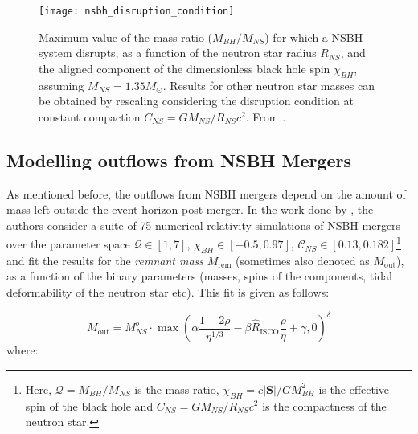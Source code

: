     \begin{figure}[H]
        \centering
        \texttt{[image: nsbh\_disruption\_condition]}
        \caption[Disruption condition in a NSBH binary]{
                    Maximum value of the mass-ratio ($M_{BH}/M_{NS}$) for which a NSBH
                    system disrupts, as a function of the neutron star radius $R_{NS}$,
                    and the aligned component of the dimensionless black hole spin
                    $\chi_{BH}$, assuming $M_{NS} = 1.35 M_{\odot}$. Results for other
                    neutron star masses can be obtained by rescaling considering the
                    disruption condition at constant compaction $C_{NS} = GM_{NS}/R_{NS}
                    c^2$. From \cite{foucart_2020}.
            }
        \label{fig:nsbh_disruption_condition}
    \end{figure}

    \subsection{Modelling outflows from NSBH Mergers}\label{ssec:outflows-nsbh}

    As mentioned before, the outflows from NSBH mergers depend on the amount of mass
    left outside the event horizon post-merger. In the work done by \cite{foucart_2018},
    the authors consider a suite of 75 numerical relativity simulations of NSBH mergers
    over the parameter space $\mathcal{Q} \in [1, 7]$, $ \chi_{BH} \in [-0.5, 0.97]$,
    $\mathcal{C}_{NS} \in [0.13, 0.182]$\footnote{
        Here, $\mathcal{Q} = M_{BH}/M_{NS}$ is the mass-ratio, $\chi_{BH} =
        c|\mathbf{S}|/GM_{BH}^2$ is the effective spin of the black hole and $C_{NS} =
        GM_{NS}/R_{NS}c^2$ is the compactness of the neutron star.
    }
    and fit the results for the \textit{remnant mass} $M_{\mathrm{rem}}$ (sometimes also
    denoted as $M_{\mathrm{out}}$), as a function of the binary parameters (masses,
    spins of the components, tidal deformability of the neutron star etc). This fit is
    given as follows:

    \begin{equation}
        M_{\mathrm{out}} =
            M_{NS}^b \cdot
            \max \left( \alpha \dfrac{1-2\rho}{\eta^{1/3}} -
            \beta \hat{R}_{\mathrm{ISCO}} \dfrac{\rho}{\eta} + \gamma, 0 \right)^\delta
    \end{equation}
    where:

